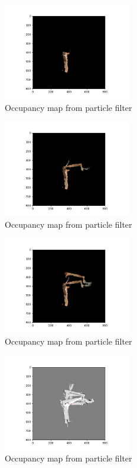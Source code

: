\documentclass[a4paper]{article}
\begin{document}
\begin{figure}[h]
    \centering
    \includegraphics[width=0.5\textwidth]{texture1000.png}
    \caption{Occupancy map from particle filter}
    \label{fig:particle_filter}
\end{figure}
\begin{figure}[h]
    \centering
    \includegraphics[width=0.5\textwidth]{texture1500.png}
    \caption{Occupancy map from particle filter}
    \label{fig:particle_filter}
\end{figure}
\begin{figure}[h]
    \centering
    \includegraphics[width=0.5\textwidth]{texture2000.png}
    \caption{Occupancy map from particle filter}
    \label{fig:particle_filter}
\end{figure}
\begin{figure}[h]
    \centering
    \includegraphics[width=0.5\textwidth]{map_0.png}
    \caption{Occupancy map from particle filter}
    \label{fig:particle_filter}
\end{figure}
\end{document}
